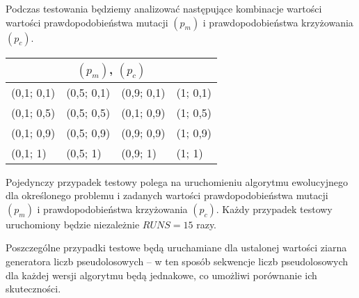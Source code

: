\documentclass[12pt, a4paper]{article}
\begin{document}
Podczas testowania będziemy analizować następujące kombinacje wartości wartości prawdopodobieństwa mutacji $(p_m)$ i prawdopodobieństwa krzyżowania $(p_c)$.

\bigskip

\begin{center}
\begin{tabular}{|l|l|l|l|}
\hline
\multicolumn{4}{|c|}{$(p_m)$, $(p_c)$} \\
\hline
(0,1; 0,1) & (0,5; 0,1) & (0,9; 0,1) & (1; 0,1)\\
\hline
(0,1; 0,5) & (0,5; 0,5) & (0,1; 0,9) & (1; 0,5)\\
\hline
(0,1; 0,9) & (0,5; 0,9) & (0,9; 0,9) & (1; 0,9)\\
\hline
(0,1; 1) & (0,5; 1) & (0,9; 1) & (1; 1)\\
\hline
\end{tabular}
\end{center}

\bigskip
Pojedynczy przypadek testowy polega na uruchomieniu algorytmu ewolucyjnego dla określonego problemu i zadanych wartości prawdopodobieństwa mutacji $(p_m)$ i prawdopodobieństwa krzyżowania $(p_c)$. Każdy przypadek testowy uruchomiony będzie niezależnie $RUNS = 15$ razy.

Poszczególne przypadki testowe będą uruchamiane dla ustalonej wartości ziarna generatora liczb pseudolosowych -- w ten sposób sekwencje liczb pseudolosowych dla każdej wersji algorytmu będą jednakowe, co umożliwi porównanie ich skuteczności.
 
\nocite{*}


\end{document}
